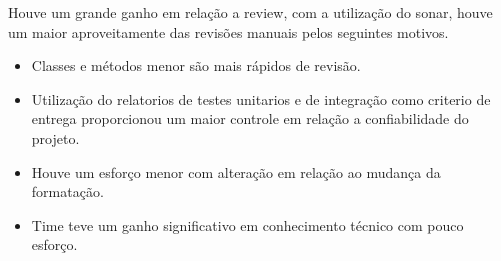 \documentclass[12pt]{article}
\begin{document}
Houve um grande ganho em relação a review, com a utilização do sonar, houve um maior aproveitamente das revisões manuais pelos seguintes motivos.
 \begin{itemize}
	\item Classes e métodos menor são mais rápidos de revisão.
  \item Utilização do relatorios de testes unitarios e de integração como criterio de entrega proporcionou um maior controle em relação a confiabilidade do projeto.
	\item Houve um esforço menor com alteração em relação ao mudança da formatação.
	\item Time teve um ganho significativo em conhecimento técnico com pouco esforço.
\end{itemize}

%


\end{document}
